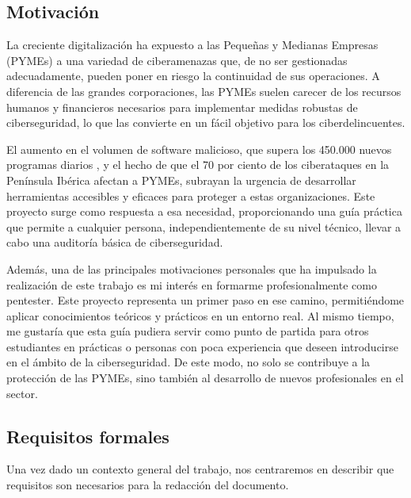 \documentclass[a4paper, 10pt]{article}
\begin{document}
\subsection{Motivación}
La creciente digitalización ha expuesto a las Pequeñas y Medianas Empresas (PYMEs) a una variedad de ciberamenazas que, de no ser gestionadas adecuadamente, 
pueden poner en riesgo la continuidad de sus operaciones. A diferencia de las grandes corporaciones, las PYMEs suelen carecer de los recursos humanos y financieros 
necesarios para implementar medidas robustas de ciberseguridad, lo que las convierte en un fácil objetivo para los ciberdelincuentes.
\par\vspace{0.5cm}
El aumento en el volumen de software malicioso, que supera los 450.000 nuevos programas diarios \cite{avtest}, y el hecho de que el 70 
por ciento de los ciberataques en la Península Ibérica afectan a PYMEs, subrayan la urgencia de desarrollar herramientas accesibles y eficaces para proteger a estas organizaciones. 
Este proyecto surge como respuesta a esa necesidad, proporcionando una guía práctica que permite a cualquier persona, independientemente de su nivel técnico, llevar a cabo una auditoría 
básica de ciberseguridad.
\par\vspace{0.5cm}
Además, una de las principales motivaciones personales que ha impulsado la realización de este trabajo es mi interés en formarme profesionalmente como pentester. 
Este proyecto representa un primer paso en ese camino, permitiéndome aplicar conocimientos teóricos y prácticos en un entorno real. Al mismo tiempo, me gustaría que esta guía 
pudiera servir como punto de partida para otros estudiantes en prácticas o personas con poca experiencia que deseen introducirse en el ámbito de la ciberseguridad. 
De este modo, no solo se contribuye a la protección de las PYMEs, sino también al desarrollo de nuevos profesionales en el sector.
\par\vspace{0.5cm}


\subsection{Requisitos formales}
Una vez dado un contexto general del trabajo, nos centraremos en describir que requisitos son necesarios para la redacción
 del documento.
\end{document}
